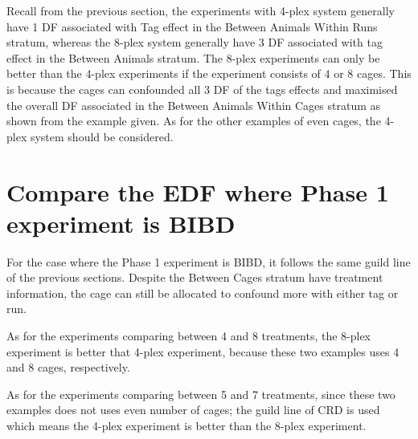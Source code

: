 \documentclass[12pt,a4paper]{article}
\begin{document}
Recall from the previous section, the experiments with 4-plex system generally have 1 DF associated with Tag effect in the Between Animals Within Runs stratum, whereas the 8-plex system generally have 3 DF associated with tag effect in the Between Animals stratum. The 8-plex experiments can only be better than the 4-plex experiments if the experiment consists of 4 or 8 cages. This is because the cages can confounded all 3 DF of the tags effects and maximised the overall DF associated in the Between Animals Within Cages stratum as shown from the example given. As for the other examples of even cages, the 4-plex system should be considered. 


\section{Compare the EDF where Phase 1 experiment is BIBD}
For the case where the Phase 1 experiment is BIBD, it follows the same guild line of the previous sections. Despite the Between Cages stratum have treatment information, the cage can still be allocated to confound more with either tag or run. 

As for the experiments comparing between 4 and 8 treatments, the 8-plex experiment is better that 4-plex experiment, because these two examples uses 4 and 8 cages, respectively.  

As for the experiments comparing between 5 and 7 treatments, since these two examples does not uses even number of cages; the guild line of CRD is used which means the 4-plex experiment is better than the 8-plex experiment. 
\end{document}

